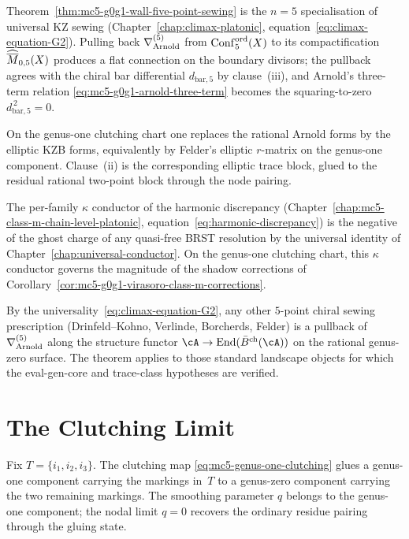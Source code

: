 \begin{remark}
\label{rem:mc5-g0g1-climax-integration}
Theorem~\ref{thm:mc5-g0g1-wall-five-point-sewing} is the $n = 5$
specialisation of universal KZ sewing
\textup{(}Chapter~\ref{chap:climax-platonic},
equation~\eqref{eq:climax-equation-G2}\textup{)}. Pulling back
$\nabla^{(5)}_{\mathrm{Arnold}}$ from $\mathrm{Conf}^{\mathrm{ord}}_{5}(X)$ to its compactification
$\widehat{\overline{M}}_{0,5}(X)$ produces a flat connection on the boundary
divisors; the pullback agrees with the chiral bar differential
$d_{\mathrm{bar}, 5}$ by clause~(iii), and Arnold's three-term relation
\eqref{eq:mc5-g0g1-arnold-three-term} becomes the squaring-to-zero
$d_{\mathrm{bar}, 5}^{\, 2} = 0$.

On the genus-one clutching chart one replaces the rational Arnold forms
by the elliptic KZB forms, equivalently by Felder's elliptic
$r$-matrix on the genus-one component. Clause~\textup{(ii)} is the
corresponding elliptic trace block, glued to the residual rational
two-point block through the node pairing.

The per-family $\kappa$ conductor of the harmonic discrepancy
\textup{(}Chapter~\ref{chap:mc5-class-m-chain-level-platonic},
equation~\eqref{eq:harmonic-discrepancy}\textup{)} is the negative of
the ghost charge of any quasi-free BRST resolution by the universal
identity of Chapter~\ref{chap:universal-conductor}. On the genus-one
clutching chart, this $\kappa$ conductor governs the magnitude of the
shadow corrections of
Corollary~\ref{cor:mc5-g0g1-virasoro-class-m-corrections}.

By the universality~\eqref{eq:climax-equation-G2}, any other $5$-point
chiral sewing prescription \textup{(}Drinfeld--Kohno, Verlinde,
Borcherds, Felder\textup{)} is a pullback of $\nabla^{(5)}_{\mathrm{Arnold}}$ along
the structure functor $\cA \to \mathrm{End}(\BarOrd(\cA))$ on the
rational genus-zero surface. The theorem applies to those standard
landscape objects for which the eval-gen-core and trace-class
hypotheses are verified.
\end{remark}

\section{The Clutching Limit}
\label{sec:mc5-g0g1-inner-motion}

Fix $T=\{i_1,i_2,i_3\}$. The clutching map
\eqref{eq:mc5-genus-one-clutching} glues a genus-one component carrying
the markings in~$T$ to a genus-zero component carrying the two remaining
markings. The smoothing parameter $q$ belongs to the genus-one
component; the nodal limit $q=0$ recovers the ordinary residue pairing
through the gluing state.

